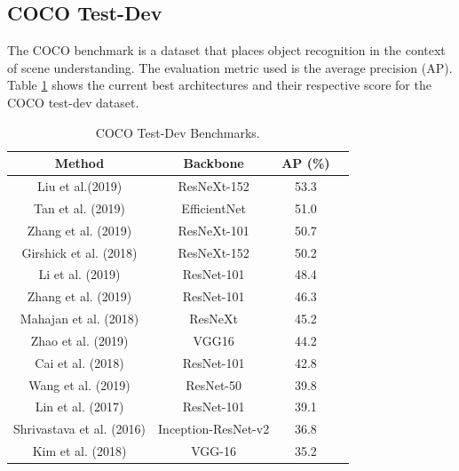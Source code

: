 \newpage
\subsection{COCO Test-Dev}

\par The COCO benchmark \cite{Lin2014} is a dataset that places object recognition in the context of scene understanding. The evaluation metric used is the average precision (AP). Table \ref{table:cocotable} shows the current best architectures and their respective score for the COCO test-dev dataset.

\begin{table}[H]
    
    \centering
    \caption {COCO Test-Dev Benchmarks.}
    \begin{tabular}{| c | c | c | c ||} 
    \hline
    Method & Backbone & AP (\%)  \\ [0.5ex] 
    \hline\hline
    Liu et al.(2019) \cite{Liu2019}  & ResNeXt-152 & 53.3 \\ 
    \hline
    Tan et al. (2019) \cite{Tan2019} & EfficientNet & 51.0 \\
    \hline
    Zhang et al. (2019) \cite{Zhang2019} & ResNeXt-101 & 50.7
    \\
    \hline
    Girshick et al. (2018) \cite{Detectron2018} & ResNeXt-152 & 50.2
    \\
    \hline
    Li et al. (2019) \cite{Li2019} & ResNet-101 & 48.4
    \\ [1ex] 
    \hline
    Zhang et al. (2019) \cite{Zhang2019} & ResNet-101  & 46.3
    \\ [1ex]
    \hline
    Mahajan et al. (2018) \cite{Mahajan2018} & ResNeXt & 45.2
    \\ [1ex]
    \hline
    Zhao et al. (2019) \cite{Zhao2019} & VGG16 & 44.2
    \\ [1ex]
    \hline
    Cai et al. (2018) \cite{Cai2018} & ResNet-101 & 42.8
    \\ [1ex]
    \hline
    Wang et al. (2019) \cite{Wang2019} & ResNet-50    & 39.8
    \\ [1ex]
    \hline
    Lin et al. (2017) \cite{Lin2017} & ResNet-101 & 39.1
    \\ [1ex]
    \hline
    Shrivastava et al. (2016) \cite{shrivastava2016skip} & Inception-ResNet-v2 & 36.8
    \\ [1ex]
    \hline
    Kim et al. (2018) \cite{Kim2018} & VGG-16 & 35.2
    \\ [1ex]
    \hline
   \end{tabular}
   \label{table:cocotable}
\end{table}

